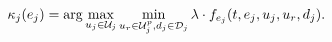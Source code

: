 \vspace{-1.5em}
\begin{equation}
\label{eq:robust_tracking_law}
\tracklaw_j(e_j) = \arg\max_{u_j \in \cset_j} \min_{u_r \in\cset^p_j, d_j \in \dset_j} \lambda \cdot f_{e_j}(t,e_j,u_j,u_r,d_j).
\end{equation}

%
%
%

